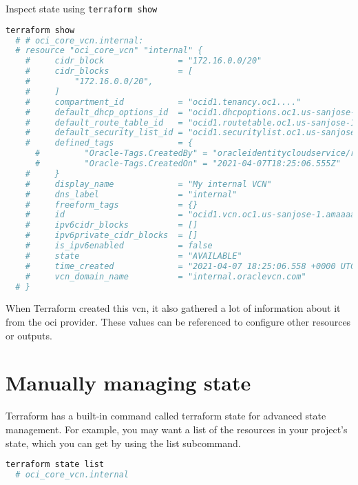\documentclass[../main.tex]{subfiles}
\begin{document}
Inspect state using \lstinline{terraform show}
\begin{lstlisting}[language=bash]
  terraform show
  # # oci_core_vcn.internal:
  # resource "oci_core_vcn" "internal" {
    #     cidr_block               = "172.16.0.0/20"
    #     cidr_blocks              = [
    #         "172.16.0.0/20",
    #     ]
    #     compartment_id           = "ocid1.tenancy.oc1...."
    #     default_dhcp_options_id  = "ocid1.dhcpoptions.oc1.us-sanjose-1.aaaaaaaa6odqyurw4mf7jmf3jy6ehtw6n32ohyogy4w5c43qoubgewyxr2va"
    #     default_route_table_id   = "ocid1.routetable.oc1.us-sanjose-1.aaaaaaaan3n6iazjfubarvwwtszl3v6gdzqvfoccdj555p2ujehbo4tlu7ma"
    #     default_security_list_id = "ocid1.securitylist.oc1.us-sanjose-1.aaaaaaaant6vlu2y77pwwzjubmzg6czzvo2laii4h3p5d7w2nqcr4fey5gaa"
    #     defined_tags             = {
      #         "Oracle-Tags.CreatedBy" = "oracleidentitycloudservice/redacted"
      #         "Oracle-Tags.CreatedOn" = "2021-04-07T18:25:06.555Z"
    #     }
    #     display_name             = "My internal VCN"
    #     dns_label                = "internal"
    #     freeform_tags            = {}
    #     id                       = "ocid1.vcn.oc1.us-sanjose-1.amaaaaaapqqlmeyaklull6tpfms534aoijpjwpkzjo25rxqiqhadgdzodnua"
    #     ipv6cidr_blocks          = []
    #     ipv6private_cidr_blocks  = []
    #     is_ipv6enabled           = false
    #     state                    = "AVAILABLE"
    #     time_created             = "2021-04-07 18:25:06.558 +0000 UTC"
    #     vcn_domain_name          = "internal.oraclevcn.com"
  # }
\end{lstlisting}
When Terraform created this \acrfull{vcn}, it also gathered a lot of information about it from the \acrshort{oci} provider. These values can be referenced to configure other resources or outputs.

\section{Manually managing state}
Terraform has a built-in command called terraform state for advanced state management. For example, you may want a list of the resources in your project's state, which you can get by using the list subcommand.

\begin{lstlisting}[language=bash]
  terraform state list
  # oci_core_vcn.internal
\end{lstlisting}
\end{document}

